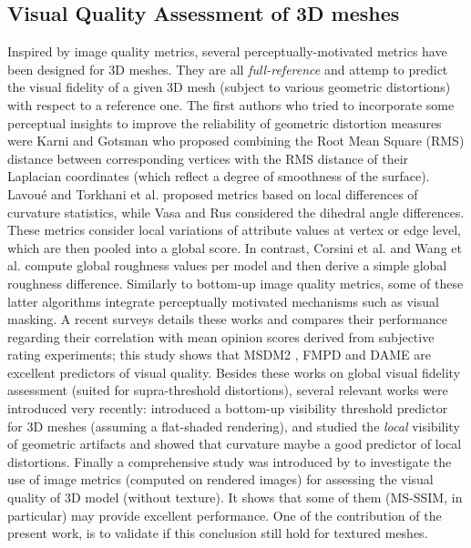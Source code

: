 \subsection{Visual Quality Assessment of 3D meshes}
Inspired by image quality metrics, several perceptually-motivated metrics have been designed for 3D meshes. They are all \textit{full-reference} and attemp to predict the visual fidelity of a given 3D mesh (subject to various geometric distortions) with respect to a reference one. The first authors who tried to incorporate some perceptual insights to improve the reliability of geometric distortion measures were Karni and Gotsman \cite{KARNI2000} who proposed combining the Root Mean Square (RMS) distance between corresponding vertices with the RMS distance of their Laplacian coordinates (which reflect a degree of smoothness of the surface). Lavou\'e \cite{Lavoue2011} and Torkhani et al. \cite{Torkhani2012} proposed metrics based on local differences of curvature statistics, while Vasa and Rus \cite{Vasa2012} considered the dihedral angle differences. These metrics consider local variations of attribute values at vertex or edge level, which are then pooled into a global score. In contrast, Corsini et al. \cite{Corsini2007} and Wang et al. \cite{Wang2012} compute global roughness values per model and then derive a simple global roughness difference. Similarly to bottom-up image quality metrics, some of these latter algorithms \cite{Torkhani2012,Wang2012,Vasa2012} integrate perceptually motivated mechanisms such as visual masking. A recent surveys \cite{Corsini2013} details these works and compares their performance regarding their correlation with mean opinion scores derived from subjective rating experiments; this study shows that MSDM2 \cite{Lavoue2011}, FMPD \cite{Wang2012} and DAME \cite{Vasa2012} are excellent predictors of visual quality. Besides these works on global visual fidelity assessment (suited for supra-threshold distortions), several relevant works were introduced very recently: \citet{Nader2016} introduced a bottom-up visibility threshold predictor for 3D meshes (assuming a flat-shaded rendering), and \citet{Guo2015} studied the \textit{local} visibility of geometric artifacts and showed that curvature maybe a good predictor of local distortions. Finally a comprehensive study was introduced by \citet{GuillaumeLavoue2016} to investigate the use of image metrics (computed on rendered images) for assessing the visual quality of 3D model (without texture). It shows that some of them (MS-SSIM, in particular) may provide excellent performance. One of the contribution of the present work, is to validate if this conclusion still hold for textured meshes.

